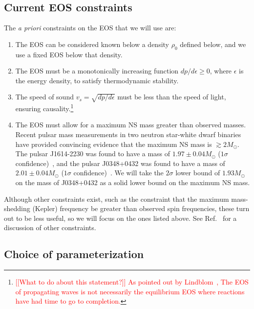 \documentclass[twocolumn,prd,amssymb,aps,nofootinbib,showpacs,epsf]{revtex4}
\newcommand{\red}{\textcolor{red}}
\begin{document}
\subsection{Current EOS constraints}
\label{sec:eosconstraints}

The {\it a priori} constraints on the EOS that we will use are:
\begin{enumerate}
\item The EOS can be considered known below a density $\rho_0$ defined below, and we use a fixed EOS below that density.
\item The EOS must be a monotonically increasing function $dp/d\epsilon \ge 0$, where $\epsilon$ is the energy density, to satisfy thermodynamic stability.
\item The speed of sound $v_s = \sqrt{dp/d\epsilon}$ must be less than the speed of light, ensuring causality.\footnote{\red{[[What to do about this statement?]] As pointed out by Lindblom~\cite{Lindblom2010}, The EOS of propagating waves is not necessarily the equilibrium EOS where reactions have had time to go to completion.}} 
\item The EOS must allow for a maximum NS mass greater than observed masses. Recent pulsar mass measurements in two neutron star-white dwarf binaries have provided convincing evidence that the maximum NS mass is $\gtrsim 2M_\odot$. The pulsar J1614-2230 was found to have a mass of $1.97\pm0.04M_\odot$ ($1\sigma$ confidence)~\cite{DemorestPennucciRansom2010}, and the pulsar J0348+0432 was found to have a mass of $2.01\pm0.04M_\odot$ ($1\sigma$ confidence)~\cite{AntoniadisFreireWex2013}. We will take the $2\sigma$ lower bound of $1.93M_\odot$ on the mass of J0348+0432 as a solid lower bound on the maximum NS mass.
\end{enumerate}

Although other constraints exist, such as the constraint that the maximum mass-shedding (Kepler) frequency be greater than observed spin frequencies, these turn out to be less useful, so we will focus on the ones listed above. See Ref.~\cite{ReadLackey2009} for a discussion of other constraints.

\subsection{Choice of parameterization}
\label{sec:eosparam}
\end{document}
